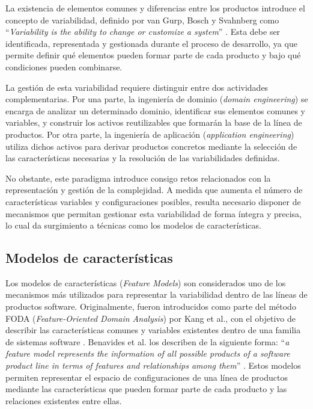 La existencia de elementos comunes y diferencias entre los productos introduce el concepto de variabilidad, definido por van Gurp, Bosch y Svahnberg como \enquote{\textit{Variability is the ability to change or customize a system}} \cite{vanGurp2001}. Esta debe ser identificada, representada y gestionada durante el proceso de desarrollo, ya que permite definir qué elementos pueden formar parte de cada producto y bajo qué condiciones pueden combinarse.

La gestión de esta variabilidad requiere distinguir entre dos actividades complementarias. Por una parte, la ingeniería de dominio (\textit{domain engineering}) se encarga de analizar un determinado dominio, identificar sus elementos comunes y variables, y construir los activos reutilizables que formarán la base de la línea de productos. Por otra parte, la ingeniería de aplicación (\textit{application engineering}) utiliza dichos activos para derivar productos concretos mediante la selección de las características necesarias y la resolución de las variabilidades definidas.

No obstante, este paradigma introduce consigo retos relacionados con la representación y gestión de la complejidad. A medida que aumenta el número de características variables y configuraciones posibles, resulta necesario disponer de mecanismos que permitan gestionar esta variabilidad de forma íntegra y precisa, lo cual da surgimiento a técnicas como los modelos de características.


\subsection{Modelos de características}
\label{subsec:feature_models}

Los modelos de características (\textit{Feature Models}) son considerados uno de los mecanismos más utilizados para representar la variabilidad dentro de las líneas de productos software. Originalmente, fueron introducidos como parte del método FODA (\textit{Feature-Oriented Domain Analysis}) por Kang et al., con el objetivo de describir las características comunes y variables existentes dentro de una familia de sistemas software \cite{kang1990}. Benavides et al. los describen de la siguiente forma: \enquote{\textit{a feature model represents the information of all possible products of a software product line in terms of features and relationships among them}} \cite{benavides2010}. Estos modelos permiten representar el espacio de configuraciones de una línea de productos mediante las características que pueden formar parte de cada producto y las relaciones existentes entre ellas.

